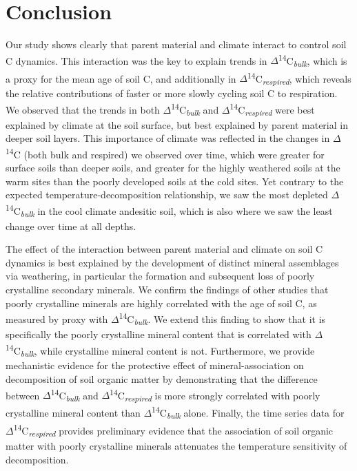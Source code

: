 \documentclass[english,man,floatsintext]{apa6}
\begin{document}
\hypertarget{conclusion}{%
\section{Conclusion}\label{conclusion}}

Our study shows clearly that parent material and climate interact to control soil C dynamics. This interaction was the key to explain trends in \(\Delta\)\textsuperscript{14}C\textsubscript{\emph{bulk}}, which is a proxy for the mean age of soil C, and additionally in \(\Delta\)\textsuperscript{14}C\textsubscript{\emph{respired}}, which reveals the relative contributions of faster or more slowly cycling soil C to respiration. We observed that the trends in both \(\Delta\)\textsuperscript{14}C\textsubscript{\emph{bulk}} and \(\Delta\)\textsuperscript{14}C\textsubscript{\emph{respired}} were best explained by climate at the soil surface, but best explained by parent material in deeper soil layers. This importance of climate was reflected in the changes in \(\Delta\)\textsuperscript{14}C (both bulk and respired) we observed over time, which were greater for surface soils than deeper soils, and greater for the highly weathered soils at the warm sites than the poorly developed soils at the cold sites. Yet contrary to the expected temperature-decomposition relationship, we saw the most depleted \(\Delta\)\textsuperscript{14}C\textsubscript{\emph{bulk}} in the cool climate andesitic soil, which is also where we saw the least change over time at all depths.

The effect of the interaction between parent material and climate on soil C dynamics is best explained by the development of distinct mineral assemblages via weathering, in particular the formation and subsequent loss of poorly crystalline secondary minerals. We confirm the findings of other studies that poorly crystalline minerals are highly correlated with the age of soil C, as measured by proxy with \(\Delta\)\textsuperscript{14}C\textsubscript{\emph{bulk}}. We extend this finding to show that it is specifically the poorly crystalline mineral content that is correlated with \(\Delta\)\textsuperscript{14}C\textsubscript{\emph{bulk}}, while crystalline mineral content is not. Furthermore, we provide mechanistic evidence for the protective effect of mineral-association on decomposition of soil organic matter by demonstrating that the difference between \(\Delta\)\textsuperscript{14}C\textsubscript{\emph{bulk}} and \(\Delta\)\textsuperscript{14}C\textsubscript{\emph{respired}} is more strongly correlated with poorly crystalline mineral content than \(\Delta\)\textsuperscript{14}C\textsubscript{\emph{bulk}} alone. Finally, the time series data for \(\Delta\)\textsuperscript{14}C\textsubscript{\emph{respired}} provides preliminary evidence that the association of soil organic matter with poorly crystalline minerals attenuates the temperature sensitivity of decomposition.
\end{document}
